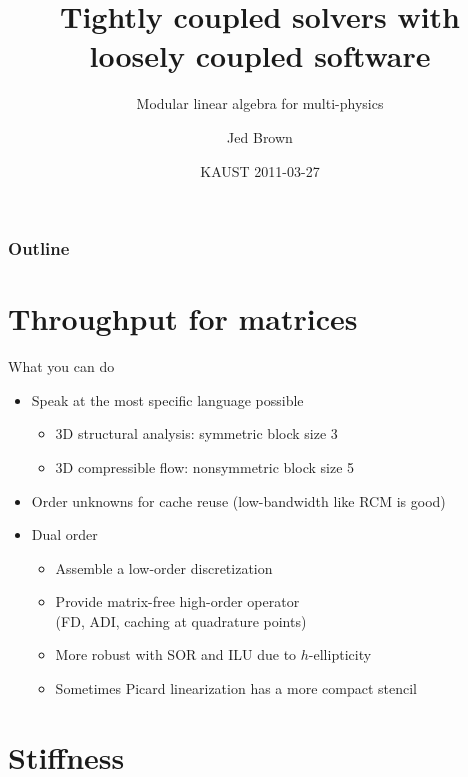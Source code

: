 \documentclass{beamer}
\title{Tightly coupled solvers with loosely coupled software}
\subtitle{Modular linear algebra for multi-physics}
\author{Jed Brown}
\institute[ETH Z\"urich]
{
  Laboratory of Hydrology, Hydraulics, and Glaciology \\
  ETH Z\"urich
}
\date{KAUST 2011-03-27}
\begin{document}
\lstset{language=C}
\normalem

\begin{frame}
\titlepage
\end{frame}

\begin{frame}
\frametitle{Outline}
\tableofcontents
\end{frame}

\section{Throughput for matrices}








\begin{frame}{What you can do}
  \begin{itemize}
  \item Speak at the most specific language possible
    \begin{itemize}
    \item 3D structural analysis: symmetric block size 3
    \item 3D compressible flow: nonsymmetric block size 5
    \end{itemize}
  \item Order unknowns for cache reuse (low-bandwidth like RCM is good)
  \item Dual order
    \begin{itemize}
    \item Assemble a low-order discretization
    \item Provide matrix-free high-order operator \\
      (FD, ADI, caching at quadrature points)
    \item More robust with SOR and ILU due to $h$-ellipticity
    \item Sometimes Picard linearization has a more compact stencil
    \end{itemize}
  \end{itemize}
\end{frame}

\section{Stiffness}









\end{document}
